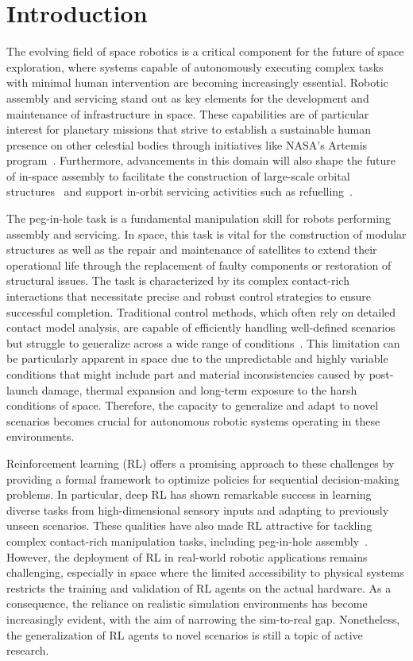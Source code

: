 \section{Introduction}\label{sec:introduction}

The evolving field of space robotics is a critical component for the future of space exploration, where systems capable of autonomously executing complex tasks with minimal human intervention are becoming increasingly essential. Robotic assembly and servicing stand out as key elements for the development and maintenance of infrastructure in space. These capabilities are of particular interest for planetary missions that strive to establish a sustainable human presence on other celestial bodies through initiatives like NASA's Artemis program~\cite{nasa2020artemis}. Furthermore, advancements in this domain will also shape the future of in-space assembly to facilitate the construction of large-scale orbital structures~\cite{zhihui2021review} and support in-orbit servicing activities such as refuelling~\cite{esa2023in_orbit_servicing}.

The peg-in-hole task is a fundamental manipulation skill for robots performing assembly and servicing. In space, this task is vital for the construction of modular structures as well as the repair and maintenance of satellites to extend their operational life through the replacement of faulty components or restoration of structural issues. The task is characterized by its complex contact-rich interactions that necessitate precise and robust control strategies to ensure successful completion. Traditional control methods, which often rely on detailed contact model analysis, are capable of efficiently handling well-defined scenarios but struggle to generalize across a wide range of conditions~\cite{xu2019compare}. This limitation can be particularly apparent in space due to the unpredictable and highly variable conditions that might include part and material inconsistencies caused by post-launch damage, thermal expansion and long-term exposure to the harsh conditions of space. Therefore, the capacity to generalize and adapt to novel scenarios becomes crucial for autonomous robotic systems operating in these environments.

Reinforcement learning (RL) offers a promising approach to these challenges by providing a formal framework to optimize policies for sequential decision-making problems. In particular, deep RL has shown remarkable success in learning diverse tasks from high-dimensional sensory inputs and adapting to previously unseen scenarios. These qualities have also made RL attractive for tackling complex contact-rich manipulation tasks, including peg-in-hole assembly~\cite{elguea2023review}. However, the deployment of RL in real-world robotic applications remains challenging, especially in space where the limited accessibility to physical systems restricts the training and validation of RL agents on the actual hardware. As a consequence, the reliance on realistic simulation environments has become increasingly evident, with the aim of narrowing the sim-to-real gap. Nonetheless, the generalization of RL agents to novel scenarios is still a topic of active research.

